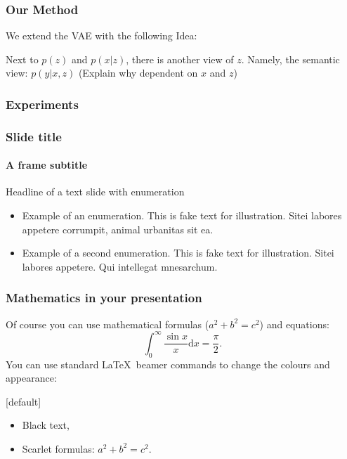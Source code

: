 \documentclass[t,aspectratio=169]{beamer}
\begin{document}
\begin{frame}[fragile]
  \frametitle{Our Method}
  We extend the VAE with the following Idea:
  
  Next to $p(z)$ and $p(x | z)$, there is another view of $z$. Namely, the semantic view: $p(y | x, z)$ (Explain why dependent on $x$ and $z$)
  
\end{frame}


\begin{frame}[fragile]
  \frametitle{Experiments}
  
\end{frame}


\begin{frame}
  \frametitle{Slide title}
  \framesubtitle{A frame subtitle}
  Headline of a text slide with enumeration
  \begin{itemize}
    \item Example of an enumeration. This is fake text for illustration. Sitei labores appetere corrumpit, animal urbanitas sit ea.
    \item Example of a second enumeration. This is fake text for illustration. Sitei labores appetere. Qui intellegat mnesarchum.
  \end{itemize}
\end{frame}


\begin{frame}
  \frametitle{Mathematics in your presentation}
  
  Of course you can use mathematical formulas ($a^2+b^2=c^2$) and equations:
  \begin{equation}
    \int_0^\infty \frac{\sin x}{x} \text{d}x=\frac{\pi}{2}.
  \end{equation}
  You can use standard \LaTeX\ beamer commands to change the colours and appearance:
  
  [default]         %
  
  \begin{itemize}
    \item Black text,
    \item Scarlet formulas: $a^2+b^2=c^2$.
  \end{itemize}
\end{frame}
\end{document}
